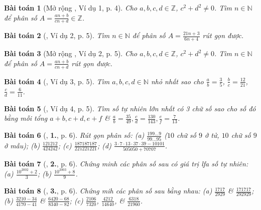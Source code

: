 \documentclass{article}
\numberwithin{equation}{section}
\newtheorem{baitoan}{Bài toán}
\begin{document}
\begin{baitoan}[Mở rộng \cite{Binh_Toan_6_tap_2}, Ví dụ 1, p. 4]
	Cho $a,b,c,d\in\mathbb{Z}$, $c^2 + d^2\ne0$. Tìm $n\in\mathbb{N}$ để phân số $A = \frac{an + b}{cn + d}\in\mathbb{Z}$.
\end{baitoan}

\begin{baitoan}[\cite{Binh_Toan_6_tap_2}, Ví dụ 2, p. 5]
	Tìm $n\in\mathbb{N}$ để phân số $A = \frac{21n + 3}{6n + 4}$ rút gọn được.
\end{baitoan}

\begin{baitoan}[Mở rộng \cite{Binh_Toan_6_tap_2}, Ví dụ 2, p. 5]
	Cho $a,b,c,d\in\mathbb{Z}$, $c^2 + d^2\ne0$. Tìm $n\in\mathbb{N}$ để phân số $A = \frac{an + b}{cn + d}$ rút gọn được.
\end{baitoan}

\begin{baitoan}[\cite{Binh_Toan_6_tap_2}, Ví dụ 3, p. 5]
	Tìm $a,b,c,d\in\mathbb{N}$ nhỏ nhất sao cho $\frac{a}{b} = \frac{3}{5}$, $\frac{b}{c} = \frac{12}{21}$, $\frac{c}{d} = \frac{6}{11}$.
\end{baitoan}

\begin{baitoan}[\cite{Binh_Toan_6_tap_2}, Ví dụ 4, p. 5]
	Tìm số tự nhiên lớn nhất có 3 chữ số sao cho số đó bằng mỗi tổng $a + b,c + d,e + f$ \& $\frac{a}{b} = \frac{35}{49},\frac{c}{d} = \frac{130}{143},\frac{e}{f} = \frac{7}{13}$.
\end{baitoan}

\begin{baitoan}[\cite{Binh_Toan_6_tap_2}, \textbf{1.}, p. 6]
	Rút gọn phân số: (a) $\frac{199\ldots9}{99\ldots95}$ ($10$ chữ số $9$ ở tử, $10$ chữ số $9$ ở mẫu); (b) $\frac{121212}{424242}$; (c) $\frac{187187187}{221221221}$; (d) $\frac{3\cdot7\cdot13\cdot37\cdot39 - 10101}{505050 + 70707}$.
\end{baitoan}

\begin{baitoan}[\cite{Binh_Toan_6_tap_2}, \textbf{2.}, p. 6]
	Chứng minh các phân số sau có giá trị lfa số tự nhiên: (a) $\frac{10^{2002} + 2}{3}$; (b) $\frac{10^{2003} + 8}{9}$.
\end{baitoan}

\begin{baitoan}[\cite{Binh_Toan_6_tap_2}, \textbf{3.}, p. 6]
	Chứng mih các phân số sau bằng nhau: (a) $\frac{1717}{2929}$ \& $\frac{171717}{292929}$; (b) $\frac{3210 - 34}{4170 - 41}$ \& $\frac{6420 - 68}{8340 - 82}$; (c) $\frac{2106}{7320}$, $\frac{4212}{14640}$, \& $\frac{6318}{21960}$.
\end{baitoan}
\end{document}
